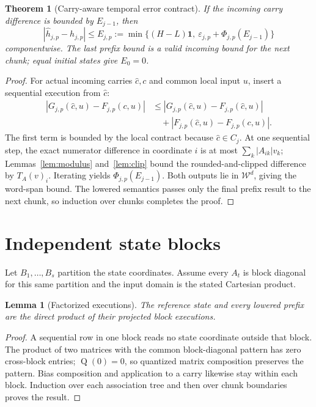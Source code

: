 \documentclass[11pt]{article}
\newtheorem{lemma}[definition]{Lemma}
\newtheorem{theorem}[definition]{Theorem}
\newcommand{\W}{\mathcal W}
\newcommand{\Q}{\operatorname{Q}}
\begin{document}
\begin{theorem}[Carry-aware temporal error contract]\label{thm:temporal}
If the incoming carry difference is bounded by $E_{j-1}$, then
\[
 |\widehat h_{j,p}-h_{j,p}|
 \le E_{j,p}:=\min\{(H-L)\mathbf 1,\ \varepsilon_{j,p}+\Phi_{j,p}(E_{j-1})\}
\]
componentwise. The last prefix bound is a valid incoming bound for the next chunk; equal initial states give $E_0=0$.
\end{theorem}
\begin{proof}
For actual incoming carries $\widehat c,c$ and common local input $u$, insert a sequential execution from $\widehat c$:
\begin{align*}
 |G_{j,p}(\widehat c,u)-F_{j,p}(c,u)|
 &\le |G_{j,p}(\widehat c,u)-F_{j,p}(\widehat c,u)|\\
 &\quad+|F_{j,p}(\widehat c,u)-F_{j,p}(c,u)|.
\end{align*}
The first term is bounded by the local contract because $\widehat c\in C_j$. At one sequential step, the exact numerator difference in coordinate $i$ is at most $\sum_k|A_{ik}|v_k$; Lemmas~\ref{lem:modulus} and~\ref{lem:clip} bound the rounded-and-clipped difference by $T_A(v)_i$. Iterating yields $\Phi_{j,p}(E_{j-1})$. Both outputs lie in $\W^d$, giving the word-span bound. The lowered semantics passes only the final prefix result to the next chunk, so induction over chunks completes the proof.
\end{proof}

\section{Independent state blocks}
Let $B_1,\ldots,B_s$ partition the state coordinates. Assume every $A_t$ is block diagonal for this same partition and the input domain is the stated Cartesian product.

\begin{lemma}[Factorized executions]\label{lem:factor}
The reference state and every lowered prefix are the direct product of their projected block executions.
\end{lemma}
\begin{proof}
A sequential row in one block reads no state coordinate outside that block. The product of two matrices with the common block-diagonal pattern has zero cross-block entries; $\Q(0)=0$, so quantized matrix composition preserves the pattern. Bias composition and application to a carry likewise stay within each block. Induction over each association tree and then over chunk boundaries proves the result.
\end{proof}
\end{document}

